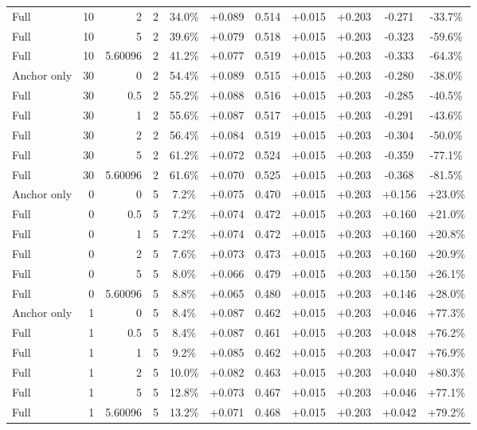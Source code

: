 \begin{table}[htbp]
\begin{tabular}{lrrrccccccc}
Full & 10 & 2 & 2 & 34.0\% & +0.089 & 0.514 & +0.015 & +0.203 & -0.271 & -33.7\% \\
Full & 10 & 5 & 2 & 39.6\% & +0.079 & 0.518 & +0.015 & +0.203 & -0.323 & -59.6\% \\
Full & 10 & 5.60096 & 2 & 41.2\% & +0.077 & 0.519 & +0.015 & +0.203 & -0.333 & -64.3\% \\
Anchor only & 30 & 0 & 2 & 54.4\% & +0.089 & 0.515 & +0.015 & +0.203 & -0.280 & -38.0\% \\
Full & 30 & 0.5 & 2 & 55.2\% & +0.088 & 0.516 & +0.015 & +0.203 & -0.285 & -40.5\% \\
Full & 30 & 1 & 2 & 55.6\% & +0.087 & 0.517 & +0.015 & +0.203 & -0.291 & -43.6\% \\
Full & 30 & 2 & 2 & 56.4\% & +0.084 & 0.519 & +0.015 & +0.203 & -0.304 & -50.0\% \\
Full & 30 & 5 & 2 & 61.2\% & +0.072 & 0.524 & +0.015 & +0.203 & -0.359 & -77.1\% \\
Full & 30 & 5.60096 & 2 & 61.6\% & +0.070 & 0.525 & +0.015 & +0.203 & -0.368 & -81.5\% \\
Anchor only & 0 & 0 & 5 & 7.2\% & +0.075 & 0.470 & +0.015 & +0.203 & +0.156 & +23.0\% \\
Full & 0 & 0.5 & 5 & 7.2\% & +0.074 & 0.472 & +0.015 & +0.203 & +0.160 & +21.0\% \\
Full & 0 & 1 & 5 & 7.2\% & +0.074 & 0.472 & +0.015 & +0.203 & +0.160 & +20.8\% \\
Full & 0 & 2 & 5 & 7.6\% & +0.073 & 0.473 & +0.015 & +0.203 & +0.160 & +20.9\% \\
Full & 0 & 5 & 5 & 8.0\% & +0.066 & 0.479 & +0.015 & +0.203 & +0.150 & +26.1\% \\
Full & 0 & 5.60096 & 5 & 8.8\% & +0.065 & 0.480 & +0.015 & +0.203 & +0.146 & +28.0\% \\
Anchor only & 1 & 0 & 5 & 8.4\% & +0.087 & 0.462 & +0.015 & +0.203 & +0.046 & +77.3\% \\
Full & 1 & 0.5 & 5 & 8.4\% & +0.087 & 0.461 & +0.015 & +0.203 & +0.048 & +76.2\% \\
Full & 1 & 1 & 5 & 9.2\% & +0.085 & 0.462 & +0.015 & +0.203 & +0.047 & +76.9\% \\
Full & 1 & 2 & 5 & 10.0\% & +0.082 & 0.463 & +0.015 & +0.203 & +0.040 & +80.3\% \\
Full & 1 & 5 & 5 & 12.8\% & +0.073 & 0.467 & +0.015 & +0.203 & +0.046 & +77.1\% \\
Full & 1 & 5.60096 & 5 & 13.2\% & +0.071 & 0.468 & +0.015 & +0.203 & +0.042 & +79.2\% \\

\end{tabular}
\end{table}
